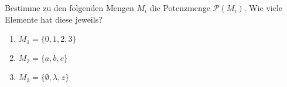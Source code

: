 \begin{exercise}
  Bestimme zu den folgenden Mengen \(M_{i}\) die Potenzmenge
  \(\mathcal{P}(M_{i})\). Wie viele Elemente hat diese jeweils?
  \begin{enumerate}
  \item \(M_{1} = \{0, 1, 2, 3\}\)
  \item \(M_{2} = \{a, b, c\}\)
  \item \(M_{3} = \{\emptyset, \lambda, z\}\)
  \end{enumerate}
\end{exercise}
